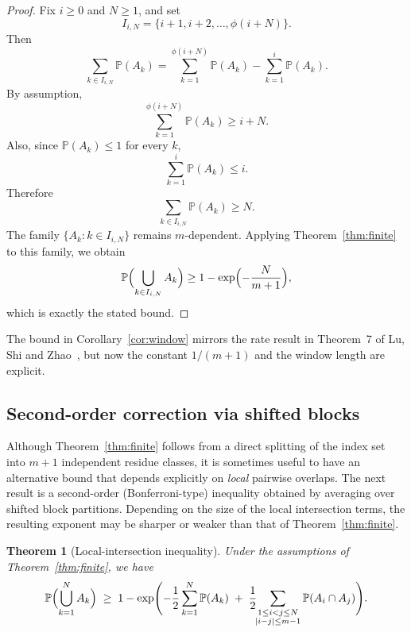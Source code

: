 \documentclass[11pt]{article}
\newtheorem{theorem}{Theorem}
\begin{document}
\begin{proof}
Fix $i\ge0$ and $N\ge1$, and set
\[
  I_{i,N}=\{i+1,i+2,\dots,\phi(i+N)\}.
\]
Then
\[
  \sum_{k\in I_{i,N}} \mathbb{P}(A_k)
  =
  \sum_{k=1}^{\phi(i+N)} \mathbb{P}(A_k)
  -
  \sum_{k=1}^{i} \mathbb{P}(A_k).
\]
By assumption,
\[
  \sum_{k=1}^{\phi(i+N)} \mathbb{P}(A_k)\ge i+N.
\]
Also, since \(\mathbb{P}(A_k)\le 1\) for every \(k\),
\[
  \sum_{k=1}^{i} \mathbb{P}(A_k)\le i.
\]
Therefore
\[
  \sum_{k\in I_{i,N}} \mathbb{P}(A_k)\ge N.
\]
The family \(\{A_k:k\in I_{i,N}\}\) remains $m$-dependent.  Applying
Theorem~\ref{thm:finite} to this family, we obtain
\[
  \mathbb{P}\Bigl(\bigcup_{k\in I_{i,N}} A_k\Bigr)
  \ge 1-\exp\Bigl(-\frac{N}{m+1}\Bigr),
\]
which is exactly the stated bound.
\end{proof}

The bound in Corollary~\ref{cor:window} mirrors the rate result in
Theorem~7 of Lu, Shi and Zhao~\cite{LuShiZhao2026}, but now the
constant \(1/(m+1)\) and the window length are explicit.

\subsection{Second-order correction via shifted blocks}
Although Theorem~\ref{thm:finite} follows from a direct splitting of the
index set into $m+1$ independent residue classes, it is sometimes useful to
have an alternative bound that depends explicitly on \emph{local} pairwise
overlaps.  The next result is a second-order (Bonferroni-type) inequality
obtained by averaging over shifted block partitions.  Depending on the size
of the local intersection terms, the resulting exponent may be sharper or
weaker than that of Theorem~\ref{thm:finite}.

\begin{theorem}[Local-intersection inequality]\label{thm:cov}
Under the assumptions of Theorem~\ref{thm:finite}, we have
\begin{equation}\label{eq:cov-refined}
  \mathbb{P}\Bigl(\bigcup_{k=1}^N A_k\Bigr)
  \;\ge\;
  1-\exp\Biggl(
   -\frac{1}{2}\sum_{k=1}^N \mathbb{P}(A_k)
   \;+\;\frac{1}{2}\!\!\sum_{\substack{1\le i<j\le N\\|i-j|\le m-1}}
   \mathbb{P}(A_i\cap A_j)
  \Biggr).
\end{equation}
\end{theorem}
\end{document}
